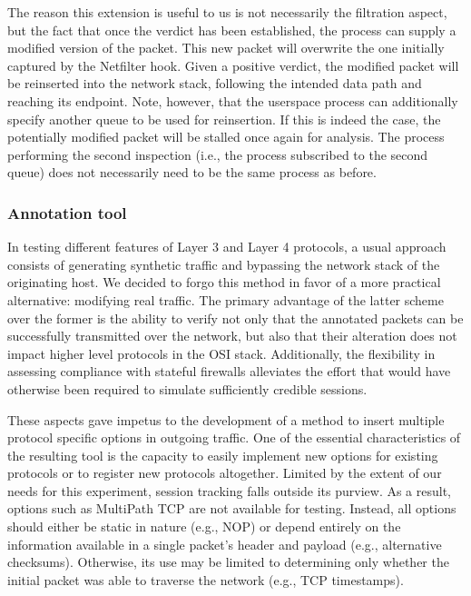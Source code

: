 The reason this extension is useful to us is not necessarily the filtration aspect, but the fact that once the verdict has been established, the process can supply a modified version of the packet. This new packet will overwrite the one initially captured by the Netfilter hook. Given a positive verdict, the modified packet will be reinserted into the network stack, following the intended data path and reaching its endpoint. Note, however, that the userspace process can additionally specify another queue to be used for reinsertion. If this is indeed the case, the potentially modified packet will be stalled once again for analysis. The process performing the second inspection (i.e., the process subscribed to the second queue) does not necessarily need to be the same process as before.

\subsubsection{Annotation tool}
\label{extend:ops:architecture:annotation}

In testing different features of Layer 3 and Layer 4 protocols, a usual approach consists of generating synthetic traffic and bypassing the network stack of the originating host. We decided to forgo this method in favor of a more practical alternative: modifying real traffic. The primary advantage of the latter scheme over the former is the ability to verify not only that the annotated packets can be successfully transmitted over the network, but also that their alteration does not impact higher level protocols in the OSI stack. Additionally, the flexibility in assessing compliance with stateful firewalls alleviates the effort that would have otherwise been required to simulate sufficiently credible sessions.

These aspects gave impetus to the development of a method to insert multiple protocol specific options in outgoing traffic. One of the essential characteristics of the resulting tool is the capacity to easily implement new options for existing protocols or to register new protocols altogether. Limited by the extent of our needs for this experiment, session tracking falls outside its purview. As a result, options such as MultiPath TCP are not available for testing. Instead, all options should either be static in nature (e.g., NOP) or depend entirely on the information available in a single packet's header and payload (e.g., alternative checksums). Otherwise, its use may be limited to determining only whether the initial packet was able to traverse the network (e.g., TCP timestamps).

